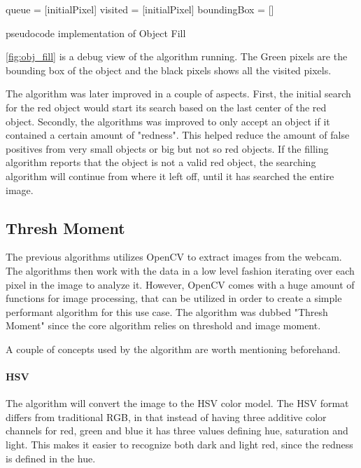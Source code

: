\begin{algorithm}[H]
	queue = [initialPixel]\;
	visited = [initialPixel]\;
	boundingBox = []\;
 	\BlankLine
 	\caption{pseudocode implementation of Object Fill}
\end{algorithm}

\autoref{fig:obj_fill} is a debug view of the algorithm running.
The Green pixels are the bounding box of the object and the black pixels shows all the visited pixels.


The algorithm was later improved in a couple of aspects.
First, the initial search for the red object would start its search based on the last center of the red object.
Secondly, the algorithms was improved to only accept an object if it contained a certain amount of "redness".
This helped reduce the amount of false positives from very small objects or big but not so red objects.
If the filling algorithm reports that the object is not a valid red object, the searching algorithm will continue from where it left off, until it has searched the entire image.

\subsection{Thresh Moment}\label{des:thresh}

The previous algorithms utilizes OpenCV to extract images from the webcam. 
The algorithms then work with the data in a low level fashion iterating over each pixel in the image to analyze it.
However, OpenCV comes with a huge amount of functions for image processing, that can be utilized in order to create a simple performant algorithm for this use case. 
The algorithm was dubbed "Thresh Moment" since the core algorithm relies on threshold and image moment.

A couple of concepts used by the algorithm are worth mentioning beforehand.

\paragraph{HSV}
The algorithm will convert the image to the HSV color model.
The HSV format differs from traditional RGB, in that instead of having three additive color channels for red, green and blue it has three values defining hue, saturation and light.
This makes it easier to recognize both dark and light red, since the redness is defined in the hue.

